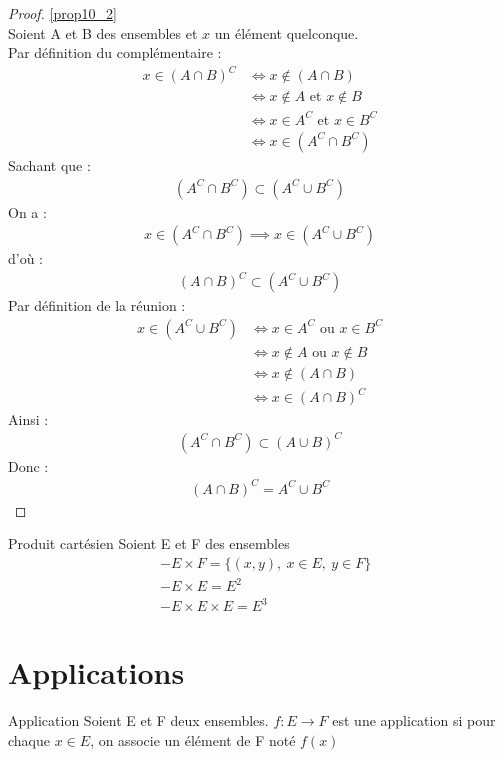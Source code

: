 \begin{proof}
	\ref{prop10_2} 
	\\
	Soient A et B des ensembles et $x$ un élément quelconque. \\
	\framebox{$\subset$} Par définition du complémentaire :
	\begin{align*}
		x \in (A \cap B)^C &\iff x \notin (A \cap B) \\ 
		&\iff x \notin A \text{ et } x \notin B \\
		&\iff x \in A^C \text{ et } x \in B^C \\
		&\iff x \in (A^C \cap B^C)
	\end{align*}
	Sachant que :
	\begin{align*}
		(A^C \cap B^C) \subset (A^C \cup B^C)
	\end{align*}
	On a :
	\begin{align*}
		x \in (A^C \cap B^C) \implies x \in (A^C \cup B^C)
	\end{align*}
	d'où :
	\begin{align*}
		(A \cap B)^C \subset (A^C \cup B^C)
	\end{align*}
	\framebox{$\supset$} Par définition de la réunion :
	\begin{align*}
		x \in (A^C \cup B^C) &\iff x \in A^C \text{ ou } x \in B^C \\
		&\iff x \notin A \text{ ou } x \notin B \\
		&\iff x \notin (A \cap B) \\
		&\iff x \in (A \cap B)^C
	\end{align*}
	Ainsi : 
	\begin{align*}
		(A^C \cap B^C) \subset (A \cup B)^C
	\end{align*}
	Donc :
	\begin{align*}
		(A \cap B)^C = A^C \cup B^C
	\end{align*}
\end{proof}

\begin{definition}{Produit cartésien}
	Soient E et F des ensembles
	\begin{align*}
		&- E \times F = \{(x, y),\ x \in E,\ y \in F\} \\
		&- E \times E = E^2 \\
		&- E \times E \times E = E^3
	\end{align*}
\end{definition}

\section{Applications}
\begin{definition}{Application}
	Soient E et F deux ensembles. $f:E \to F$ est une application si pour chaque $x \in E$, on associe un élément de F noté $f(x)$
\end{definition}

